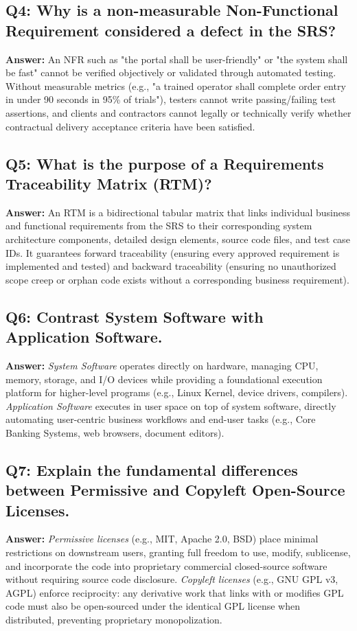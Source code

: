 \subsection*{Q4: Why is a non-measurable Non-Functional Requirement considered a defect in the SRS?}
\textbf{Answer:} An NFR such as "the portal shall be user-friendly" or "the system shall be fast" cannot be verified objectively or validated through automated testing. Without measurable metrics (e.g., "a trained operator shall complete order entry in under 90 seconds in 95\% of trials"), testers cannot write passing/failing test assertions, and clients and contractors cannot legally or technically verify whether contractual delivery acceptance criteria have been satisfied.

\subsection*{Q5: What is the purpose of a Requirements Traceability Matrix (RTM)?}
\textbf{Answer:} An RTM is a bidirectional tabular matrix that links individual business and functional requirements from the SRS to their corresponding system architecture components, detailed design elements, source code files, and test case IDs. It guarantees forward traceability (ensuring every approved requirement is implemented and tested) and backward traceability (ensuring no unauthorized scope creep or orphan code exists without a corresponding business requirement).

\subsection*{Q6: Contrast System Software with Application Software.}
\textbf{Answer:} \textit{System Software} operates directly on hardware, managing CPU, memory, storage, and I/O devices while providing a foundational execution platform for higher-level programs (e.g., Linux Kernel, device drivers, compilers). \textit{Application Software} executes in user space on top of system software, directly automating user-centric business workflows and end-user tasks (e.g., Core Banking Systems, web browsers, document editors).

\subsection*{Q7: Explain the fundamental differences between Permissive and Copyleft Open-Source Licenses.}
\textbf{Answer:} \textit{Permissive licenses} (e.g., MIT, Apache 2.0, BSD) place minimal restrictions on downstream users, granting full freedom to use, modify, sublicense, and incorporate the code into proprietary commercial closed-source software without requiring source code disclosure. \textit{Copyleft licenses} (e.g., GNU GPL v3, AGPL) enforce reciprocity: any derivative work that links with or modifies GPL code must also be open-sourced under the identical GPL license when distributed, preventing proprietary monopolization.

